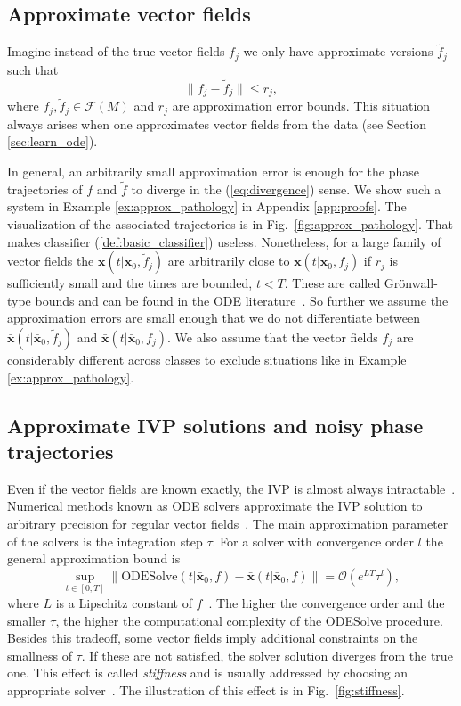 \documentclass[referee, pdflatex, sn-mathphys-num]{sn-jnl}
\theoremstyle{definition}
\theoremstyle{plain}
\newcommand{\bbx}{\ensuremath{\bar{\mathbf{x}}}}
\begin{document}
	\subsection{Approximate vector fields}
	
	Imagine instead of the true vector fields $f_j$ we only have approximate versions $\tilde{f}_j$ such that
	\begin{equation*}
		\lVert f_j - \tilde{f}_j \rVert \le r_j,
	\end{equation*}
	where $f_j, \tilde{f}_j \in \mathcal{F}(M)$ and $r_j$ are approximation error bounds. This situation always arises when one approximates vector fields from the data (see Section \ref{sec:learn_ode}).
	
	In general, an arbitrarily small approximation error is enough for the phase trajectories of $f$ and $\tilde{f}$ to diverge in the (\ref{eq:divergence}) sense. We show such a system in Example \ref{ex:approx_pathology} in Appendix \ref{app:proofs}. The visualization of the associated trajectories is in Fig.~\ref{fig:approx_pathology}. That makes classifier (\ref{def:basic_classifier}) useless. Nonetheless, for a large family of vector fields the $\bbx(t | \bbx_0, \tilde{f}_j)$ are arbitrarily close to $\bbx(t | \bbx_0, f_j)$ if $r_j$ is sufficiently small and the times are bounded, $t < T$. These are called Grönwall-type bounds and can be found in the ODE literature~\cite{arnold1992ordinary}. So further we assume the approximation errors are small enough that we do not differentiate between $\bbx(t | \bbx_0, \tilde{f}_j)$ and $\bbx(t | \bbx_0, f_j)$. We also assume that the vector fields $f_j$ are considerably different across classes to exclude situations like in Example \ref{ex:approx_pathology}.
	
	\subsection{Approximate IVP solutions and noisy phase trajectories}
	
	Even if the vector fields are known exactly, the IVP is almost always intractable~\cite{ode_solvers}. Numerical methods known as ODE solvers approximate the IVP solution to arbitrary precision for regular vector fields~\cite{ode_solvers}. The main approximation parameter of the solvers is the integration step $\tau$. For a solver with convergence order $l$ the general approximation bound is
	\begin{equation}\label{eq:converg_order}
		\underset{t \in [0, T]}{\sup} \lVert \text{ODESolve}(t | \bbx_0, f) - \bbx(t | \bbx_0, f) \rVert = \mathcal{O}(e^{LT} \tau^l),
	\end{equation}
	where $L$ is a Lipschitz constant of $f$~\cite{ode_solvers}. The higher the convergence order and the smaller $\tau$, the higher the computational complexity of the ODESolve procedure. Besides this tradeoff, some vector fields imply additional constraints on the smallness of $\tau$. If these are not satisfied, the solver solution diverges from the true one. This effect is called \emph{stiffness} and is usually addressed by choosing an appropriate solver~\cite{ode_solvers_stiff}. The illustration of this effect is in Fig.~\ref{fig:stiffness}.
	
\end{document}
